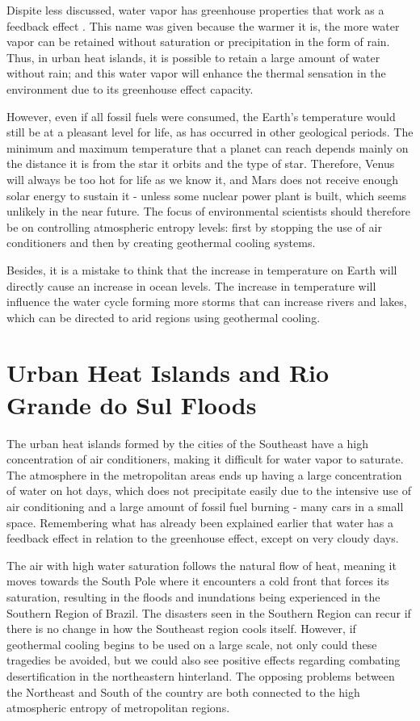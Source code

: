 Dispite less discussed, water vapor has greenhouse properties that work as a feedback effect \cite{Soden}. This name was given because the warmer it is, the more water vapor can be retained without saturation or precipitation in the form of rain. Thus, in urban heat islands, it is possible to retain a large amount of water without rain; and this water vapor will enhance the thermal sensation in the environment due to its greenhouse effect capacity.

However, even if all fossil fuels were consumed, the Earth's temperature would still be at a pleasant level for life, as has occurred in other geological periods. The minimum and maximum temperature that a planet can reach depends mainly on the distance it is from the star it orbits and the type of star. Therefore, Venus will always be too hot for life as we know it, and Mars does not receive enough solar energy to sustain it - unless some nuclear power plant is built, which seems unlikely in the near future. The focus of environmental scientists should therefore be on controlling atmospheric entropy levels: first by stopping the use of air conditioners and then by creating geothermal cooling systems.

Besides, it is a mistake to think that the increase in temperature on Earth will directly cause an increase in ocean levels. The increase in temperature will influence the water cycle forming more storms that can increase rivers and lakes, which can be directed to arid regions using geothermal cooling.

\section{Urban Heat Islands and Rio Grande do Sul Floods}

The urban heat islands formed by the cities of the Southeast have a high concentration of air conditioners, making it difficult for water vapor to saturate. The atmosphere in the metropolitan areas ends up having a large concentration of water on hot days, which does not precipitate easily due to the intensive use of air conditioning and a large amount of fossil fuel burning - many cars in a small space. Remembering what has already been explained earlier that water has a feedback effect in relation to the greenhouse effect, except on very cloudy days.

The air with high water saturation follows the natural flow of heat, meaning it moves towards the South Pole where it encounters a cold front that forces its saturation, resulting in the floods and inundations being experienced in the Southern Region of Brazil. The disasters seen in the Southern Region can recur if there is no change in how the Southeast region cools itself. However, if geothermal cooling begins to be used on a large scale, not only could these tragedies be avoided, but we could also see positive effects regarding combating desertification in the northeastern hinterland. The opposing problems between the Northeast and South of the country are both connected to the high atmospheric entropy of metropolitan regions.